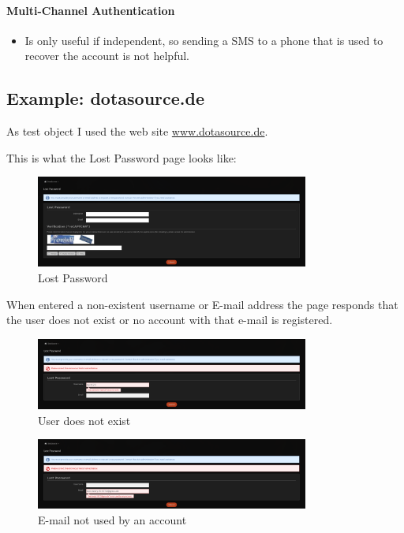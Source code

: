 \paragraph{Multi-Channel Authentication}
\begin{itemize}
	\item Is only useful if independent, so sending a SMS to a phone that is used to recover the account is not helpful.
\end{itemize}

\subsection{Example: dotasource.de}

As test object I used the web site \url{www.dotasource.de}.

This is what the Lost Password page looks like:

\begin{figure}[H]
	\centering
	\includegraphics[width=0.8\textwidth]{Assignment0x01/image/recover_1.png}
	\caption{Lost Password} \label{img:recover_1}
\end{figure}

When entered a non-existent username or E-mail address the page responds that the user does not exist or no account with that e-mail is registered.

\begin{figure}[H]
	\centering
	\includegraphics[width=0.8\textwidth]{Assignment0x01/image/recover_2.png}
	\caption{User does not exist} \label{img:recover_2}
\end{figure}

\begin{figure}[H]
	\centering
	\includegraphics[width=0.8\textwidth]{Assignment0x01/image/recover_3.png}
	\caption{E-mail not used by an account} \label{img:recover_3}
\end{figure}

